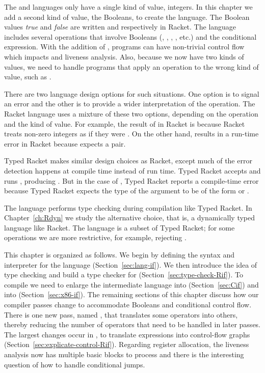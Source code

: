 \documentclass[11pt]{book}
\begin{document}
{The \LangInt{} and \LangVar{} languages only have a single kind of
value, integers. In this chapter we add a second kind of value, the
Booleans, to create the \LangIf{} language. The Boolean values
\emph{true} and \emph{false} are written  and 
respectively in Racket.  The \LangIf{} language includes several
operations that involve Booleans (, , ,
\key{<}, etc.) and the conditional  expression. With the
addition of , programs can have non-trivial control flow which
impacts  and liveness analysis. Also, because
we now have two kinds of values, we need to handle programs that apply
an operation to the wrong kind of value, such as .

There are two language design options for such situations.  One option
is to signal an error and the other is to provide a wider
interpretation of the operation. The Racket language uses a mixture of
these two options, depending on the operation and the kind of
value. For example, the result of  in Racket is
 because Racket treats non-zero integers as if they were
. On the other hand,  results in a run-time
error in Racket because  expects a pair.

Typed Racket makes similar design choices as Racket, except much of
the error detection happens at compile time instead of run time. Typed
Racket accepts and runs , producing . But in
the case of , Typed Racket reports a compile-time error
because Typed Racket expects the type of the argument to be of the
form  or .

The \LangIf{} language performs type checking during compilation like
Typed Racket. In Chapter~\ref{ch:Rdyn} we study the
alternative choice, that is, a dynamically typed language like Racket.
The \LangIf{} language is a subset of Typed Racket; for some
operations we are more restrictive, for example, rejecting
.

This chapter is organized as follows.  We begin by defining the syntax
and interpreter for the \LangIf{} language
(Section~\ref{sec:lang-if}). We then introduce the idea of type
checking and build a type checker for \LangIf{}
(Section~\ref{sec:type-check-Rif}). To compile \LangIf{} we need to
enlarge the intermediate language \LangCVar{} into \LangCIf{}
(Section~\ref{sec:Cif}) and \LangXInt{} into \LangXIf{}
(Section~\ref{sec:x86-if}). The remaining sections of this chapter
discuss how our compiler passes change to accommodate Booleans and
conditional control flow. There is one new pass, named ,
that translates some operators into others, thereby reducing the
number of operators that need to be handled in later passes.  The
largest changes occur in , to translate
 expressions into control-flow graphs
(Section~\ref{sec:explicate-control-Rif}).  Regarding register
allocation, the liveness analysis now has multiple basic blocks to
process and there is the interesting question of how to handle
conditional jumps.


}
\end{document}
